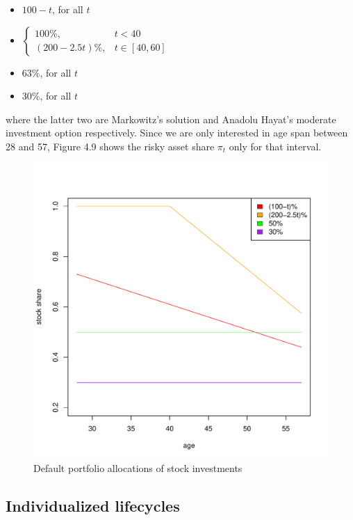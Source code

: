 \begin{itemize}
	\item $100-t$, for all $t$
	\item $\begin{cases} 100\%, & t<40\\(200-2.5t)\%, & t\in[40,60]\end{cases}$
	\item $63\%$, for all $t$
	\item $30\%$, for all $t$
\end{itemize}

where the latter two are Markowitz's solution and Anadolu Hayat's moderate investment option respectively. Since we are only interested in age span between 28 and 57, Figure 4.9 shows the risky asset share $\pi_t$ only for that interval. 

\begin{figure}[h]
	\centering
	\includegraphics[scale=0.6]{figs/defaults.pdf}
	\caption{Default portfolio allocations of stock investments}
\end{figure}


\subsection{Individualized lifecycles}


